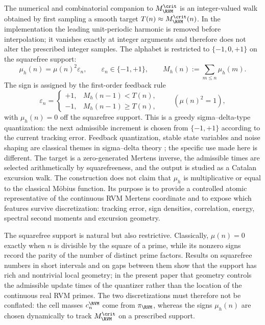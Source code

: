 The numerical and combinatorial companion to $M_{\RVM}^{\crit}$ is an
integer-valued walk obtained by first sampling a smooth target
$T(n)\approx M_{\RVM}^{\crit}(n)$.  In the implementation the leading
unit-periodic harmonic is removed before interpolation; it vanishes exactly at
integer arguments and therefore does not alter the prescribed integer samples.
The alphabet is restricted to $\{-1,0,+1\}$ on the squarefree support:
\begin{equation}
 \mu_h(n)=\mu(n)^2\varepsilon_n,
 \qquad \varepsilon_n\in\{-1,+1\},
 \qquad
 M_h(n):=\sum_{m\le n}\mu_h(m).
 \label{eq:intro-muh}
\end{equation}
The sign is assigned by the first-order feedback rule
\begin{equation}
 \varepsilon_n=
 \begin{cases}
  +1,&M_h(n-1)<T(n),\\
  -1,&M_h(n-1)\ge T(n),
 \end{cases}
 \qquad (\mu(n)^2=1),
 \label{eq:intro-quantizer}
\end{equation}
with $\mu_h(n)=0$ off the squarefree support.  This is a greedy
sigma--delta-type quantization: the next admissible increment is chosen from
$\{-1,+1\}$ according to the current tracking error.  Feedback quantization,
stable state variables and noise shaping are classical themes in sigma--delta
theory \cite{GunturkThao1995,DaubechiesDeVore2003,BenedettoPowellYilmaz2006};
the specific use made here is different.  The target is a zero-generated
Mertens inverse, the admissible times are selected arithmetically by
squarefreeness, and the output is studied as a Catalan excursion walk.  The
construction does not claim that $\mu_h$ is multiplicative or equal to the
classical M\"obius function.  Its purpose is to provide a controlled atomic
representative of the continuous RVM Mertens coordinate and to expose which
features survive discretization: tracking error, sign densities, correlation,
energy, spectral second moments and excursion geometry.

The squarefree support is natural but also restrictive.  Classically,
$\mu(n)=0$ exactly when $n$ is divisible by the square of a prime, while its
nonzero signs record the parity of the number of distinct prime factors.
Results on squarefree numbers in short intervals and on gaps between them show
that the support has rich and nontrivial local geometry; in the present paper
that geometry controls the admissible update times of the quantizer rather
than the location of the continuous real RVM primes.  The two discretizations
must therefore not be conflated: the cell masses $c_n^{\RVM}$ come from
$\pi_{\RVM}$, whereas the signs $\mu_h(n)$ are chosen dynamically to track
$M_{\RVM}^{\crit}$ on a prescribed support.

